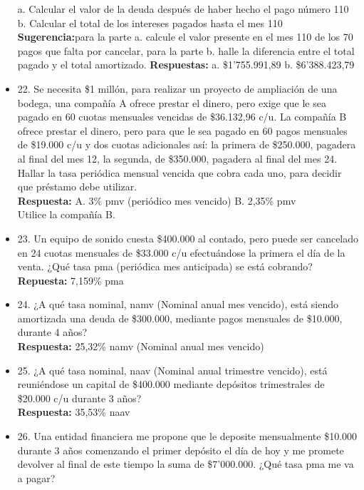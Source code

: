 \begin{itemize}
	a. Calcular el valor de la deuda después de haber hecho el pago número 110\\
	b. Calcular el total de los intereses pagados hasta el mes 110\\
	\textbf{Sugerencia:}para la parte a. calcule el valor presente en el mes 110  de los 70 pagos que falta por cancelar, para la parte b. halle la diferencia entre el total pagado y el total amortizado.
	\textbf{Respuestas:} a. \$1'755.991,89 \hspace{1,5 cm} b. \$6'388.423,79\\
	\medskip
	\item 22. Se necesita \$1 millón, para realizar un proyecto de ampliación de una bodega, una compañía A ofrece prestar el dinero, pero exige que le sea pagado en 60 cuotas mensuales vencidas de \$36.132,96 c/u. La compañía B ofrece prestar el dinero, pero para que le sea pagado en 60 pagos mensuales de \$19.000 c/u y dos cuotas adicionales así: la primera de \$250.000, pagadera al final del mes 12, la segunda, de \$350.000, pagadera al final del mes 24. Hallar la tasa periódica mensual vencida que cobra cada uno, para decidir que préstamo debe utilizar.\\
	\textbf{Respuesta:} A. 3\% pmv (periódico mes vencido) \hspace{0,5 cm}              B. 2,35\% pmv\\
	Utilice la compañía B.\\
	\medskip
	\item 23. Un equipo de sonido cuesta \$400.000 al contado, pero puede ser cancelado en 24 cuotas mensuales de \$33.000 c/u efectuándose la primera el día de la venta. ¿Qué tasa pma (periódica mes anticipada) se está cobrando?\\
	\textbf{Repuesta:} 7,159\% pma\\
	\medskip
	\item 24. ¿A qué tasa nominal, namv (Nominal anual  mes vencido), está siendo amortizada una deuda de \$300.000, mediante pagos mensuales de \$10.000, durante 4 años?\\
	\textbf{Respuesta:} 25,32\% namv (Nominal anual mes vencido)\\
	\medskip
	\item 25. ¿A qué tasa nominal, naav (Nominal anual trimestre vencido), está reuniéndose un capital de \$400.000 mediante depósitos trimestrales de \$20.000 c/u durante 3 años?\\
	\textbf{Respuesta:} 35,53\% naav\\
	\medskip
	\item 26. Una entidad financiera me propone que le deposite mensualmente \$10.000 durante 3 años comenzando el primer depósito el día de hoy y me promete devolver al final de este tiempo la suma de \$7'000.000. ¿Qué tasa pma me va a pagar?\\

\end{itemize}

